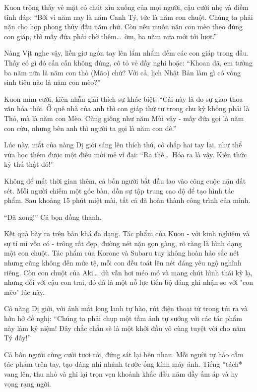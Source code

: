 \documentclass[../main.tex]{subfiles}
\begin{document}
Kuon trông thấy vẻ mặt có chút xìu xuống của mọi người, cậu cười nhẹ và điềm tĩnh đáp: ``Bởi vì năm nay là năm Canh Tý, tức là năm con chuột. Chúng ta phải nặn cho hợp phong thủy đầu năm chứ. Còn nếu muốn nặn con mèo theo đúng con giáp, thì mấy đứa phải chờ thêm\dots\ ờm, ba năm nữa mới tới lượt.''

Nàng Vịt nghe vậy, liền giơ ngón tay lên lẩm nhẩm đếm các con giáp trong đầu. Thấy có gì đó cấn cấn không đúng, cô tỏ vẻ đầy nghi hoặc: ``Khoan đã, em tưởng ba năm nữa là năm con thỏ (Mão) chứ? Với cả, lịch Nhật Bản làm gì có vòng sinh tiêu nào là năm con mèo?''

Kuon mỉm cười, kiên nhẫn giải thích sự khác biệt: ``Cái này là do sự giao thoa văn hóa thôi. Ở quê nhà của anh thì con giáp thứ tư trong chu kỳ không phải là Thỏ, mà là năm con Mèo. Cũng giống như năm Mùi vậy - mấy đứa gọi là năm con cừu, nhưng bên anh thì người ta gọi là năm con dê.''

Lúc này, mắt của nàng Dị giới sáng lên thích thú, cô chắp hai tay lại, như thể vừa học thêm được một điều mới mẻ vĩ đại: ``Ra thế\dots\ Hóa ra là vậy. Kiến thức kỳ thú thật đó!''

Không để mất thời gian thêm, cả bốn người bắt đầu lao vào công cuộc nặn đất sét. Mỗi người chiếm một góc bàn, dồn sự tập trung cao độ để tạo hình tác phẩm. Sau khoảng 15 phút miệt mài, tất cả đã hoàn thành công trình của mình.

``Đã xong!'' Cả bọn đồng thanh.

Kết quả bày ra trên bàn khá đa dạng. Tác phẩm của Kuon - với kinh nghiệm và sự tỉ mỉ vốn có - trông rất đẹp, đường nét nặn gọn gàng, rõ ràng là hình dạng một con chuột. Tác phẩm của Korone và Subaru tuy không hoàn hảo sắc nét nhưng cũng không đến mức tệ, mỗi con đều toát lên nét đáng yêu ngộ nghĩnh riêng. Còn con chuột của Aki\dots\ dù vẫn hơi méo mó và mang chút hình thái kỳ lạ, nhưng đối với cậu con trai, đó đã là một nỗ lực tiến bộ đáng ghi nhận so với "con mèo" lúc nãy.

Cô nàng Dị giới, với ánh mắt long lanh tự hào, rút điện thoại từ trong túi ra và hớn hở đề nghị: ``Chúng ta phải chụp một tấm ảnh tự sướng với các tác phẩm này làm kỷ niệm! Đây chắc chắn sẽ là một khởi đầu vô cùng tuyệt vời cho năm Tý đấy!''

Cả bốn người cùng cười tươi rói, đứng sát lại bên nhau. Mỗi người tự hào cầm tác phẩm trên tay, tạo dáng nhí nhảnh trước ống kính máy ảnh. Tiếng *tách* vang lên, thu nhỏ và ghi lại trọn vẹn khoảnh khắc đầu năm đầy ấm áp và hy vọng rạng ngời.
\end{document}
